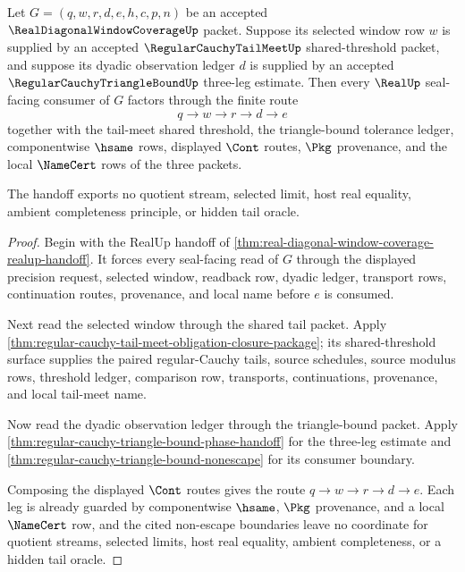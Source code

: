 \begin{theorem}
\label{thm:real-diagonal-window-coverage-tail-meet-triangle-handoff}
Let $G=(q,w,r,d,e,h,c,p,n)$ be an accepted $\RealDiagonalWindowCoverageUp$ packet. Suppose its selected window row $w$ is supplied by an accepted $\RegularCauchyTailMeetUp$ shared-threshold packet, and suppose its dyadic observation ledger $d$ is supplied by an accepted $\RegularCauchyTriangleBoundUp$ three-leg estimate. Then every $\RealUp$ seal-facing consumer of $G$ factors through the finite route
$$
q \to w \to r \to d \to e
$$
together with the tail-meet shared threshold, the triangle-bound tolerance ledger, componentwise $\hsame$ rows, displayed $\Cont$ routes, $\Pkg$ provenance, and the local $\NameCert$ rows of the three packets.

The handoff exports no quotient stream, selected limit, host real equality, ambient completeness principle, or hidden tail oracle.
\end{theorem}
\begin{proof}
Begin with the RealUp handoff of \autoref{thm:real-diagonal-window-coverage-realup-handoff}. It forces every seal-facing read of $G$ through the displayed precision request, selected window, readback row, dyadic ledger, transport rows, continuation routes, provenance, and local name before $e$ is consumed.

Next read the selected window through the shared tail packet. Apply \autoref{thm:regular-cauchy-tail-meet-obligation-closure-package}; its shared-threshold surface supplies the paired regular-Cauchy tails, source schedules, source modulus rows, threshold ledger, comparison row, transports, continuations, provenance, and local tail-meet name.

Now read the dyadic observation ledger through the triangle-bound packet. Apply \autoref{thm:regular-cauchy-triangle-bound-phase-handoff} for the three-leg estimate and \autoref{thm:regular-cauchy-triangle-bound-nonescape} for its consumer boundary.

Composing the displayed $\Cont$ routes gives the route $q \to w \to r \to d \to e$. Each leg is already guarded by componentwise $\hsame$, $\Pkg$ provenance, and a local $\NameCert$ row, and the cited non-escape boundaries leave no coordinate for quotient streams, selected limits, host real equality, ambient completeness, or a hidden tail oracle.
\end{proof}

